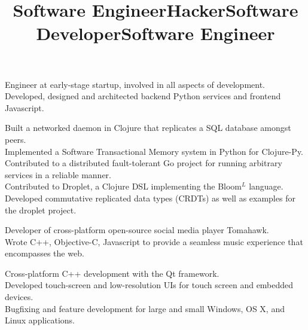 \documentclass[overlapped,line,letterpaper]{res}
\begin{document}
\begin{resume}
\title{Software Engineer}
\begin{position}
\textbullet \space Engineer at early-stage startup, involved in all aspects of development. \\
\textbullet \space Developed, designed and architected backend Python services and frontend Javascript.
\end{position}

\title{Hacker}
\begin{position}
\textbullet \space Built a networked daemon in Clojure that replicates a SQL database amongst peers.\\
\textbullet \space Implemented a Software Transactional Memory system in Python for Clojure-Py.\\
\textbullet \space Contributed to a distributed fault-tolerant Go project for running arbitrary services in a reliable manner. \\
\textbullet \space Contributed to Droplet, a Clojure DSL implementing the Bloom$^L$ language. \\
\textbullet \space Developed commutative replicated data types (CRDTs) as well as examples for the droplet project.
\end{position}

\title{Software Developer}
\begin{position}
\textbullet \space Developer of cross-platform open-source social media player Tomahawk. \\
\textbullet \space Wrote C++, Objective-C, Javascript to provide a seamless music experience that encompasses the web.
\end{position}

\title{Software Engineer}
\begin{position}
\textbullet \space Cross-platform C++ development with the Qt framework.\\
\textbullet \space Developed touch-screen and low-resolution UIs for touch screen and embedded devices.\\
\textbullet \space Bugfixing and feature development for large and small  Windows, OS X, and Linux applications. \end{position}


\end{resume}
\end{document}
